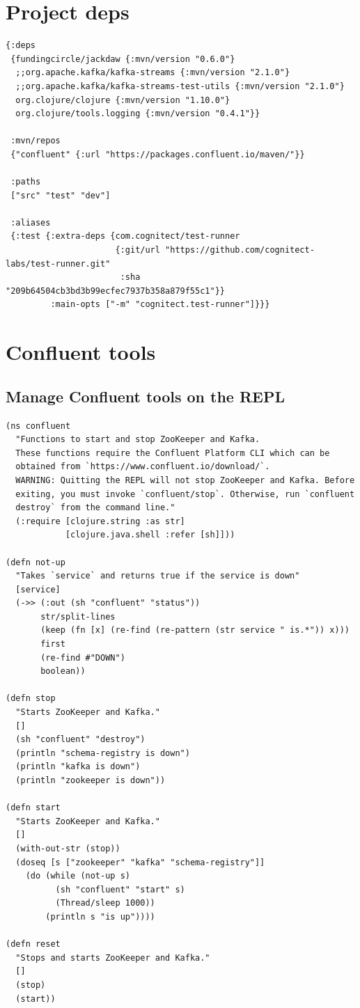 \documentclass[11pt]{article}
\author{Francisco Viramontes}
\date{\today}
\title{}
\begin{document}
\tableofcontents

\section{Project deps}
\label{sec:org5cc2e06}

\begin{verbatim}
{:deps 
 {fundingcircle/jackdaw {:mvn/version "0.6.0"}
  ;;org.apache.kafka/kafka-streams {:mvn/version "2.1.0"}
  ;;org.apache.kafka/kafka-streams-test-utils {:mvn/version "2.1.0"}
  org.clojure/clojure {:mvn/version "1.10.0"}
  org.clojure/tools.logging {:mvn/version "0.4.1"}}

 :mvn/repos
 {"confluent" {:url "https://packages.confluent.io/maven/"}}

 :paths
 ["src" "test" "dev"]

 :aliases
 {:test {:extra-deps {com.cognitect/test-runner
                      {:git/url "https://github.com/cognitect-labs/test-runner.git"
                       :sha "209b64504cb3bd3b99ecfec7937b358a879f55c1"}}
         :main-opts ["-m" "cognitect.test-runner"]}}}

\end{verbatim}

\section{Confluent tools}
\label{sec:org32b4ef8}
\subsection{Manage Confluent tools on the REPL}
\label{sec:org178699e}
\begin{verbatim}
(ns confluent
  "Functions to start and stop ZooKeeper and Kafka.
  These functions require the Confluent Platform CLI which can be
  obtained from `https://www.confluent.io/download/`.
  WARNING: Quitting the REPL will not stop ZooKeeper and Kafka. Before
  exiting, you must invoke `confluent/stop`. Otherwise, run `confluent
  destroy` from the command line."
  (:require [clojure.string :as str]
            [clojure.java.shell :refer [sh]]))

(defn not-up
  "Takes `service` and returns true if the service is down"
  [service]
  (->> (:out (sh "confluent" "status"))
       str/split-lines
       (keep (fn [x] (re-find (re-pattern (str service " is.*")) x)))
       first
       (re-find #"DOWN")
       boolean))

(defn stop
  "Starts ZooKeeper and Kafka."
  []
  (sh "confluent" "destroy")
  (println "schema-registry is down")
  (println "kafka is down")
  (println "zookeeper is down"))

(defn start
  "Starts ZooKeeper and Kafka."
  []
  (with-out-str (stop))
  (doseq [s ["zookeeper" "kafka" "schema-registry"]]
    (do (while (not-up s)
          (sh "confluent" "start" s)
          (Thread/sleep 1000))
        (println s "is up"))))

(defn reset
  "Stops and starts ZooKeeper and Kafka."
  []
  (stop)
  (start))
\end{verbatim}
\end{document}
